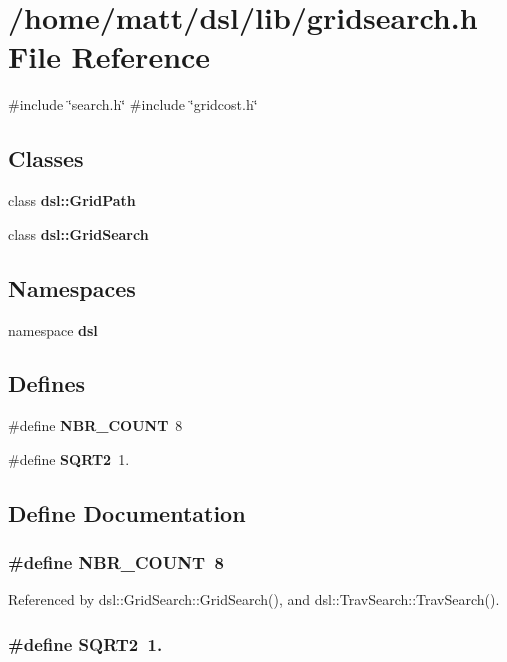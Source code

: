 \section{/home/matt/dsl/lib/gridsearch.h \-File \-Reference}
\label{gridsearch_8h}
{\ttfamily \#include \char`\"{}search.\-h\char`\"{}}\*
{\ttfamily \#include \char`\"{}gridcost.\-h\char`\"{}}\*
\subsection*{\-Classes}
\begin{DoxyCompactItemize}
\item 
class {\bf dsl\-::\-Grid\-Path}
\item 
class {\bf dsl\-::\-Grid\-Search}
\end{DoxyCompactItemize}
\subsection*{\-Namespaces}
\begin{DoxyCompactItemize}
\item 
namespace {\bf dsl}
\end{DoxyCompactItemize}
\subsection*{\-Defines}
\begin{DoxyCompactItemize}
\item 
\#define {\bf \-N\-B\-R\-\_\-\-C\-O\-U\-N\-T}~8
\item 
\#define {\bf \-S\-Q\-R\-T2}~1.
\end{DoxyCompactItemize}


\subsection{\-Define \-Documentation}
\subsubsection[{\-N\-B\-R\-\_\-\-C\-O\-U\-N\-T}]{\setlength{\rightskip}{0pt plus 5cm}\#define {\bf \-N\-B\-R\-\_\-\-C\-O\-U\-N\-T}~8}\label{gridsearch_8h_a11a86d7f840460b5ff808e0882a8d5ca}


\-Referenced by dsl\-::\-Grid\-Search\-::\-Grid\-Search(), and dsl\-::\-Trav\-Search\-::\-Trav\-Search().

\subsubsection[{\-S\-Q\-R\-T2}]{\setlength{\rightskip}{0pt plus 5cm}\#define {\bf \-S\-Q\-R\-T2}~1.}\label{gridsearch_8h_a514396dd60fa0621c83072091fb2a0cd}
